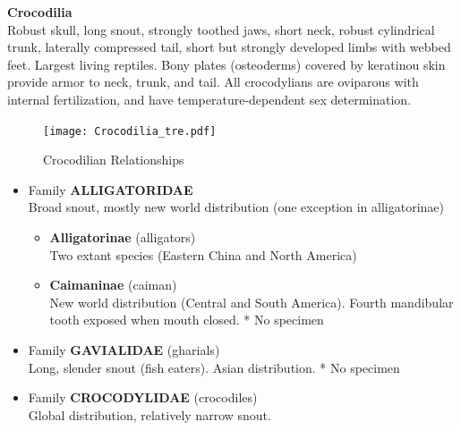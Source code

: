 \documentclass[a4paper,12pt]{article}
\begin{document}
\begin{description}
\item\textbf{Crocodilia} \\ Robust skull, long snout, strongly toothed jaws, short neck, robust cylindrical trunk, laterally compressed tail, short but strongly developed limbs with webbed feet. Largest living reptiles. Bony plates (osteoderms) covered by keratinou skin provide armor to neck, trunk, and tail. All crocodylians are oviparous with internal fertilization, and have temperature-dependent sex determination. 

\begin{figure}[H]
\centering
  \texttt{[image: Crocodilia\_tre.pdf]}
  \caption{Crocodilian Relationships}
  \label{fig:Crocodilia}
\end{figure}

\begin{itemize}
  \item Family {\textbf{ALLIGATORIDAE}} \\ Broad snout, mostly new world distribution (one exception in alligatorinae)
  \begin{itemize}
    \item {\textbf{Alligatorinae} (alligators)} \\ Two extant species (Eastern China and North America)
    \item {\textbf{Caimaninae} (caiman)} \\ New world distribution (Central and South America). Fourth mandibular tooth exposed when mouth closed. * No specimen
  \end{itemize}
  \item Family {\textbf{GAVIALIDAE} (gharials)} \\ Long, slender snout (fish eaters). Asian distribution. * No specimen
  \item Family {\textbf{CROCODYLIDAE} (crocodiles)} \\ Global distribution, relatively narrow snout.
\end{itemize}


\end{description}
\end{document}
